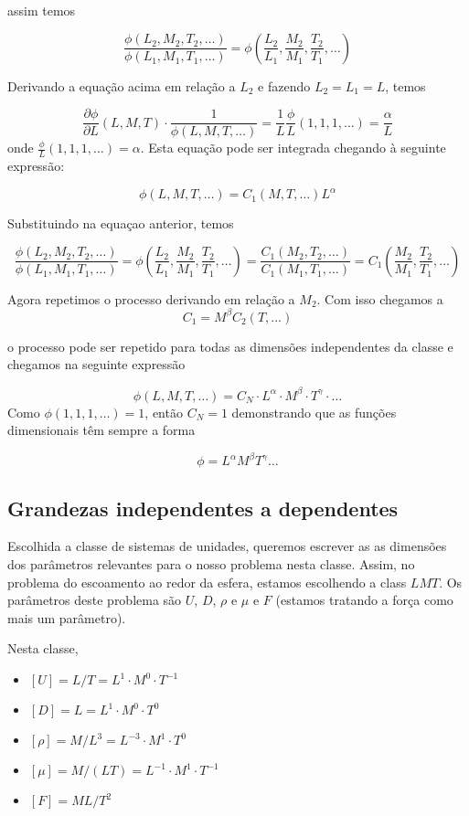 assim temos


\[
\frac{ \phi\left(L_2, M_2, T_2, \ldots\right) }{ \phi\left(L_1, M_1, T_1, \ldots\right) } = \phi\left(\frac{L_2}{L_1}, \frac{M_2}{M_1}, \frac{T_2}{T_1}, \ldots \right)
\]

Derivando a equação acima em relação a $L_2$ e fazendo $L_2 = L_1 = L$, temos

\[
\frac{\partial\phi}{\partial L}(L,M,T) \cdot \frac{1}{\phi(L,M,T,\ldots)} = \frac{1}{L}\frac{\phi}{L}(1,1,1,\ldots) = \frac{\alpha}{L}
\]
onde $\frac{\phi}{L}(1,1,1,\ldots) = \alpha$. Esta equação pode ser integrada chegando à seguinte expressão:

\[
\phi(L,M,T,\ldots) = C_1(M,T,\ldots) L^\alpha
\]

Substituindo na equaçao anterior, temos

\[
\frac{ \phi\left(L_2, M_2, T_2, \ldots\right) }{ \phi\left(L_1, M_1, T_1, \ldots\right) } = \phi\left(\frac{L_2}{L_1}, \frac{M_2}{M_1}, \frac{T_2}{T_1}, \ldots \right) =
\frac{ C_1\left(M_2, T_2, \ldots\right) }{ C_1\left(M_1, T_1, \ldots\right) } = C_1\left(\frac{M_2}{M_1}, \frac{T_2}{T_1}, \ldots \right)
\]

Agora repetimos o processo derivando em relação a $M_2$. Com isso chegamos a
\[
C_1 = M^\beta C_2(T, \ldots)
\]

o processo pode ser repetido para todas as dimensões independentes da classe e chegamos na seguinte expressão

\[
\phi(L,M,T,\ldots) = C_N\cdot L^\alpha\cdot M^\beta \cdot T^\gamma\cdot\ldots
\]
Como $\phi(1,1,1,\ldots) = 1$, então $C_N = 1$ demonstrando que as funções dimensionais têm sempre a forma

\[
\phi = L^\alpha M^\beta T^\gamma \ldots
\]



\subsection{Grandezas independentes a dependentes}

Escolhida a classe de sistemas de unidades, queremos escrever as as dimensões dos parâmetros relevantes para o nosso problema nesta classe. Assim, no problema do escoamento ao redor da esfera, estamos escolhendo a class $LMT$. Os parâmetros deste problema são $U$, $D$, $\rho$ e $\mu$ e $F$  (estamos tratando a força como mais um parâmetro).

Nesta classe,

\begin{itemize}
\item $[U] = L/T = L^1\cdot M^0 \cdot T^{-1}$
\item $[D] = L = L^1 \cdot M^0\cdot T^0$
\item $[\rho] = M/L^3 = L^{-3}\cdot M^1\cdot T^0$
\item $[\mu] = M/(LT) = L^{-1}\cdot M^1\cdot T^{-1}$
\item $[F] = ML/T^2$
\end{itemize}

